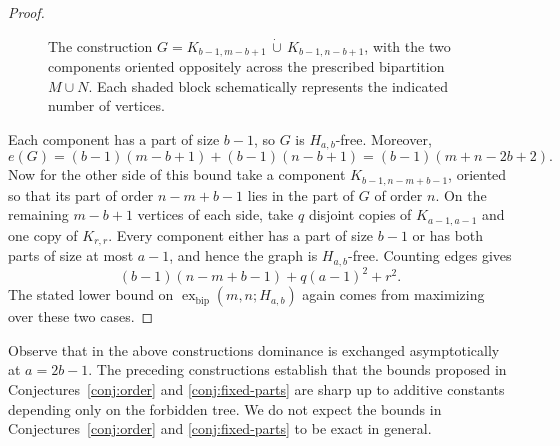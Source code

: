\documentclass[12pt]{article}
\theoremstyle{definition}
\theoremstyle{remark}
\newcommand{\exbip}{\operatorname{ex}_{\mathrm{bip}}}
\begin{document}
\begin{proof}
\begin{figure}[ht]

    \caption{The construction
    \(G=K_{b-1,m-b+1}\,\dot\cup\,
    K_{b-1,n-b+1}\), with the two components oriented oppositely
    across the prescribed bipartition \(M\cup N\). Each shaded block
    schematically represents the indicated number of vertices.}
    \label{fig:fixed-part-lower-bound}
\end{figure}
    
    Each component has a part of size $b-1$, so $G$ is $H_{a,b}$-free. Moreover,
    \[
        e(G)=(b-1)(m-b+1)+(b-1)(n-b+1)=(b-1)(m+n-2b+2).
    \]
    Now for the other side of this bound take a component $K_{b-1,n-m+b-1}$, oriented so that its part of order $n-m+b-1$ lies in the part of $G$ of order $n$. On the remaining $m-b+1$ vertices of each side, take $q$ disjoint copies of $K_{a-1,a-1}$ and one copy of $K_{r,r}$. Every component either has a part of size $b-1$ or has both parts of size at most $a-1$, and hence the graph is $H_{a,b}$-free. Counting edges gives
    \[
        (b-1)(n-m+b-1)+q(a-1)^2+r^2.
    \]
    The stated lower bound on $\exbip(m,n;H_{a,b})$ again comes from maximizing over these two cases.
\end{proof}

Observe that in the above constructions dominance is exchanged asymptotically at $a=2b-1$. The preceding constructions establish that the bounds proposed in Conjectures~\ref{conj:order} and \ref{conj:fixed-parts} are sharp up to additive constants depending only on the forbidden tree. We do not expect the bounds in Conjectures~\ref{conj:order} and \ref{conj:fixed-parts} to be exact in general.
\end{document}

